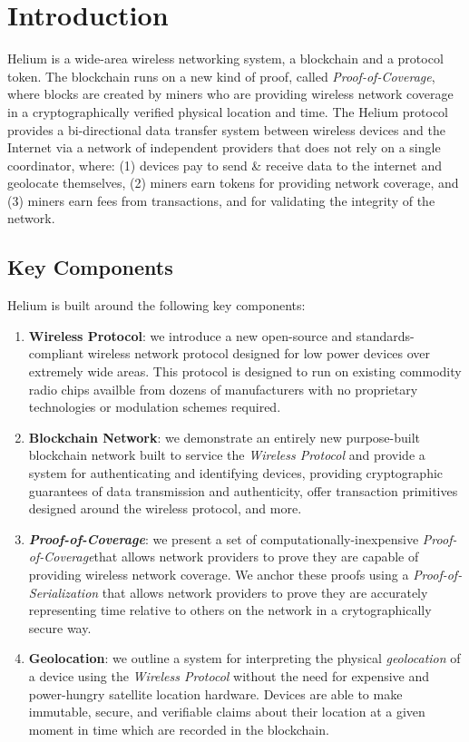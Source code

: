\documentclass[letterpaper,11pt]{article}
\newcommand{\proofofcoverage}{\textit{Proof-of-Coverage}}
\begin{document}
\newpage

\tableofcontents
\newpage

\section{Introduction}

Helium is a wide-area wireless networking system, a blockchain and a protocol token. The blockchain runs on a new kind of proof, called \proofofcoverage, where blocks are created by miners who are providing wireless network coverage in a cryptographically verified physical location and time. The Helium protocol provides a bi-directional data transfer system between wireless devices and the Internet via a network of independent providers that does not rely on a single coordinator, where: (1) devices pay to send \& receive data to the internet and geolocate themselves, (2) miners earn tokens for providing network coverage, and (3) miners earn fees from transactions, and for validating the integrity of the network.\newline

\subsection{Key Components}

Helium is built around the following key components:

\begin{enumerate}
	\item \textbf{Wireless Protocol}: we introduce a new open-source and standards-compliant wireless network protocol designed for low power devices over extremely wide areas. This protocol is designed to run on existing commodity radio chips availble from dozens of manufacturers with no proprietary technologies or modulation schemes required.
	\item \textbf{Blockchain Network}: we demonstrate an entirely new purpose-built blockchain network built to service the \textit{Wireless Protocol} and provide a system for authenticating and identifying devices, providing cryptographic guarantees of data transmission and authenticity, offer transaction primitives designed around the wireless protocol, and more.	
	\item \textbf{\proofofcoverage}: we present a set of computationally-inexpensive \proofofcoverage that allows network providers to prove they are capable of providing wireless network coverage. We anchor these proofs using a \textit{Proof-of-Serialization} that allows network providers to prove they are accurately representing time relative to others on the network in a crytographically secure way. 	
	\item \textbf{Geolocation}: we outline a system for interpreting the physical \textit{geolocation} of a device using the \textit{Wireless Protocol} without the need for expensive and power-hungry satellite location hardware. Devices are able to make immutable, secure, and verifiable claims about their location at a given moment in time which are recorded in the blockchain.
\end{enumerate}
\end{document}
